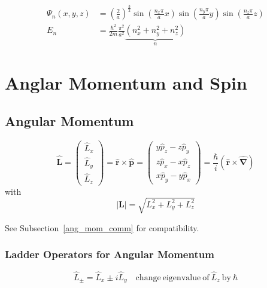 \noindent\begin{align*}
    \Psi_n \left(x,y,z\right) & ={\left(\frac{2}{a}\right)}^{\frac{3}{2}} \sin\left(\frac{n_{x}\pi}{a}x\right)\sin\left(\frac{n_{y}\pi}{a}y\right)\sin\left(\frac{n_{z}\pi}{a}z\right) \\
    E_n                       & = \frac{\hbar^{2}}{2m} \frac{\pi^{2}}{a^{2}} \underbrace{\left(n_{x}^{2}+n_{y}^{2}+n_{z}^{2}\right)}_{n}
\end{align*}

\section{Anglar Momentum and Spin}
\subsection{Angular Momentum}
\noindent\begin{equation*}
    \widehat{\mathbf{L}}=
    \begin{pmatrix}
        \widehat{L}_x \\
        \widehat{L}_y \\
        \widehat{L}_z
    \end{pmatrix}
    =\widehat{\mathbf{r}}\times\widehat{\mathbf{p}}
    =
    \begin{pmatrix}
        y\widehat{p}_z-z\widehat{p}_y \\
        z\widehat{p}_x-x\widehat{p}_z \\
        x\widehat{p}_y-y\widehat{p}_x
    \end{pmatrix}
    =\frac{\hbar}{i}(\mathbf{\widehat{r}}\times\widehat{\mathbf{\nabla}})
\end{equation*}
with
\begin{equation*}
    |\mathbf{L}|=\sqrt{L_{x}^{2}+L_{y}^{2}+L_{z}^{2}}
\end{equation*}

See Subsection~\ref{ang_mom_comm} for compatibility.

\subsubsection{Ladder Operators for Angular Momentum}

\noindent\begin{equation*}
    \widehat{L}_{\pm}=\widehat{L}_x\pm i \widehat{L}_y \quad \mathrm{change\ eigenvalue\ of\ } \widehat{L}_z \mathrm{\ by\ } \hbar
\end{equation*}

